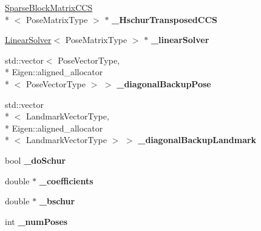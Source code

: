 \begin{DoxyCompactItemize}
\item 
\hypertarget{classg2o_1_1BlockSolver_acea4b8ea8db5a29b63bea4bc568b0b26}{\hyperlink{classg2o_1_1SparseBlockMatrixCCS}{Sparse\-Block\-Matrix\-C\-C\-S}\\*
$<$ Pose\-Matrix\-Type $>$ $\ast$ {\bfseries \-\_\-\-Hschur\-Transposed\-C\-C\-S}}\label{classg2o_1_1BlockSolver_acea4b8ea8db5a29b63bea4bc568b0b26}

\item 
\hypertarget{classg2o_1_1BlockSolver_a676a4ef473ccaecb23050284e19659af}{\hyperlink{classg2o_1_1LinearSolver}{Linear\-Solver}$<$ Pose\-Matrix\-Type $>$ $\ast$ {\bfseries \-\_\-linear\-Solver}}\label{classg2o_1_1BlockSolver_a676a4ef473ccaecb23050284e19659af}

\item 
\hypertarget{classg2o_1_1BlockSolver_a3cb6f86c522c2ea26478ad44b7c32f76}{std\-::vector$<$ Pose\-Vector\-Type, \\*
Eigen\-::aligned\-\_\-allocator\\*
$<$ Pose\-Vector\-Type $>$ $>$ {\bfseries \-\_\-diagonal\-Backup\-Pose}}\label{classg2o_1_1BlockSolver_a3cb6f86c522c2ea26478ad44b7c32f76}

\item 
\hypertarget{classg2o_1_1BlockSolver_a3bc5b19faa2c45e2c04a6743b3a083de}{std\-::vector\\*
$<$ Landmark\-Vector\-Type, \\*
Eigen\-::aligned\-\_\-allocator\\*
$<$ Landmark\-Vector\-Type $>$ $>$ {\bfseries \-\_\-diagonal\-Backup\-Landmark}}\label{classg2o_1_1BlockSolver_a3bc5b19faa2c45e2c04a6743b3a083de}

\item 
\hypertarget{classg2o_1_1BlockSolver_ab375a5fac964182442f38288bd8a103a}{bool {\bfseries \-\_\-do\-Schur}}\label{classg2o_1_1BlockSolver_ab375a5fac964182442f38288bd8a103a}

\item 
\hypertarget{classg2o_1_1BlockSolver_a416f480d4b27d7f8962ae7ae363f2e32}{double $\ast$ {\bfseries \-\_\-coefficients}}\label{classg2o_1_1BlockSolver_a416f480d4b27d7f8962ae7ae363f2e32}

\item 
\hypertarget{classg2o_1_1BlockSolver_aafddeb1d0a4218fc9c3c77169e20f81a}{double $\ast$ {\bfseries \-\_\-bschur}}\label{classg2o_1_1BlockSolver_aafddeb1d0a4218fc9c3c77169e20f81a}

\item 
\hypertarget{classg2o_1_1BlockSolver_a709259fc290d746f4174d25410b7458a}{int {\bfseries \-\_\-num\-Poses}}\label{classg2o_1_1BlockSolver_a709259fc290d746f4174d25410b7458a}


\end{DoxyCompactItemize}
